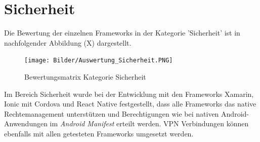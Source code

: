 \section{Sicherheit}

Die Bewertung der einzelnen Frameworks in der Kategorie 'Sicherheit' ist in nachfolgender Abbildung (X) dargestellt.

\begin{figure}[h]
	\centering
	\texttt{[image: Bilder/Auswertung\_Sicherheit.PNG]}
	\caption{Bewertungsmatrix Kategorie Sicherheit}
	\label{fig:AuswSicherheit}
\end{figure}

Im Bereich Sicherheit wurde bei der Entwicklung mit den Frameworks Xamarin, Ionic mit Cordova und React Native festgestellt, dass alle Frameworks das native Rechtemanagement unterstützen und Berechtigungen wie bei nativen Android-Anwendungen im \textit{Android Manifest} erteilt werden. VPN Verbindungen können ebenfalls mit allen getesteten Frameworks umgesetzt werden. 